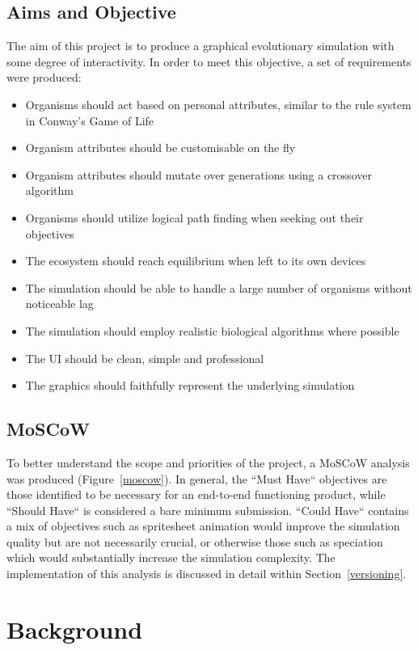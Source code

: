 \documentclass[a4paper, oneside, 11pt]{report}
\begin{document}
\section{Aims and Objective}
The aim of this project is to produce a graphical evolutionary simulation with some degree of interactivity. In order to meet this objective, a set of requirements were produced:
\begin{itemize}\label{requirements}
	\item Organisms should act based on personal attributes, similar to the rule system in Conway's Game of Life
	\item Organism attributes should be customisable on the fly
	\item Organism attributes should mutate over generations using a crossover algorithm
	\item Organisms should utilize logical path finding when seeking out their objectives
	\item The ecosystem should reach equilibrium when left to its own devices
	\item The simulation should be able to handle a large number of organisms without noticeable lag
	\item The simulation should employ realistic biological algorithms where possible
	\item The UI should be clean, simple and professional
	\item The graphics should faithfully represent the underlying simulation
\end{itemize}

\section{MoSCoW}
To better understand the scope and priorities of the project, a MoSCoW analysis was produced (Figure~\ref{moscow}). In general, the ``Must Have`` objectives are those identified to be necessary for an end-to-end functioning product, while ``Should Have`` is considered a bare minimum submission. ``Could Have`` contains a mix of objectives such as spritesheet animation would improve the simulation quality but are not necessarily crucial, or otherwise those such as speciation which would substantially increase the simulation complexity. The implementation of this analysis is discussed in detail within Section~\ref{versioning}.

\chapter{Background}\label{background}
\end{document}
